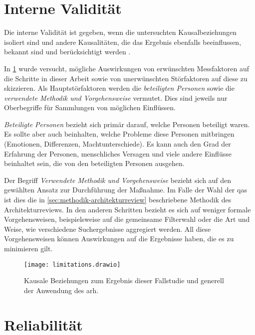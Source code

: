 \section{Interne Validität}

Die interne Validität ist gegeben, wenn die untersuchten Kausalbeziehungen isoliert sind und andere Kausalitäten, die das Ergebnis ebenfalls beeinflussen, bekannt sind und berücksichtigt werden \cite{Runeson2009}.

In \cref{fig:limitations} wurde versucht, mögliche Auswirkungen von erwünschten Messfaktoren auf die Schritte in dieser Arbeit sowie von unerwünschten Störfaktoren auf diese zu skizzieren.
Als Hauptstörfaktoren werden die \emph{beteiligten Personen} sowie die \emph{verwendete Methodik und Vorgehensweise} vermutet. 
Dies sind jeweils nur Oberbegriffe für Sammlungen von möglichen Einflüssen.

\emph{Beteiligte Personen} bezieht sich primär darauf, welche Personen beteiligt waren.
Es sollte aber auch beinhalten, welche Probleme diese Personen mitbringen (Emotionen, Differenzen, Machtunterschiede).
Es kann auch den Grad der Erfahrung der Personen, menschliches Versagen und viele andere Einflüsse beinhaltet sein, die von den beteiligten Personen ausgehen.

Der Begriff \emph{Verwendete Methodik und Vorgehensweise} bezieht sich auf den gewählten Ansatz zur Durchführung der Maßnahme.
Im Falle der Wahl der \glspl{qa} ist dies die in \cref{sec:methodik-architekturreview} beschriebene Methodik des Architekturreviews.
In den anderen Schritten bezieht es sich auf weniger formale Vorgehensweisen, beispielsweise auf die gemeinsame Filterwahl oder die Art und Weise, wie verschiedene Suchergebnisse aggregiert werden.
All diese Vorgehensweisen können Auswirkungen auf die Ergebnisse haben, die es zu minimieren gilt. 

\begin{figure}
	\centering
	\texttt{[image: limitations.drawio]}
	\caption[Kausale Beziehungen der Fallstudie]{
			Kausale Beziehungen zum Ergebnis dieser Fallstudie und generell der Anwendung des \gls{arh}.
		}
	\label{fig:limitations}
\end{figure}

\section{Reliabilität}

